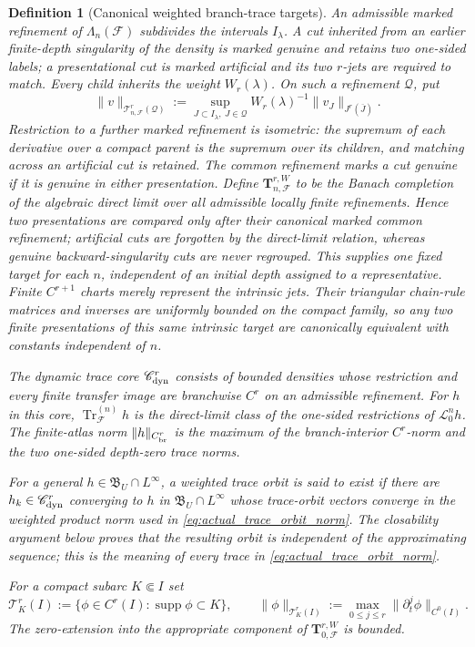 \documentclass[11pt]{amsart}
\theoremstyle{compactplain}
\theoremstyle{compactdefinition}
\newtheorem*{definition*}{Definition}
\theoremstyle{compactremark}
\newcommand{\Ltransfer}{\mathscr L}
\begin{document}
\begin{definition*}[Canonical weighted branch-trace targets]
An \emph{admissible marked refinement} of \(\Lambda_n(\mathscr F)\)
subdivides the intervals \(I_\lambda\).  A cut inherited from an earlier
finite-depth singularity of the density is marked genuine and retains two
one-sided labels; a presentational cut is marked artificial and its two
\(r\)-jets are required to match.  Every child inherits the weight
\(W_r(\lambda)\).  On such a refinement \(\mathcal Q\), put
\begin{equation}
\label{eq:dynamic_branch_trace_target}
 \|v\|_{\mathcal T_{n,\mathscr F}^r(\mathcal Q)}
 :=\sup_{J\subset I_\lambda,\ J\in\mathcal Q}
 W_r(\lambda)^{-1}\|v_J\|_{J^r(\overline J)}.
\end{equation}
Restriction to a further marked refinement is isometric: the supremum of each
derivative over a compact parent is the supremum over its children, and
matching across an artificial cut is retained.  The common refinement marks a
cut genuine if it is genuine in either presentation.  Define
\(\mathbf T_{n,\mathscr F}^{r,W}\) to be the Banach completion of the
algebraic direct limit over all admissible locally finite refinements.  Hence
two presentations are compared only after their canonical marked common
refinement; artificial cuts are forgotten by the direct-limit relation,
whereas genuine backward-singularity cuts are never regrouped.  This supplies one fixed target
for each \(n\), independent of an initial depth assigned to a representative.
Finite \(C^{r+1}\) charts merely represent the intrinsic jets.  Their
triangular chain-rule matrices and inverses are uniformly bounded on the
compact family, so any two finite presentations of this same intrinsic target
are canonically equivalent with constants independent of \(n\).

The dynamic trace core \(\mathscr C_{\rm dyn}^r\) consists of bounded
densities whose restriction and every finite transfer image are branchwise
\(C^r\) on an admissible refinement.  For \(h\) in this core,
\(\operatorname{Tr}^{(n)}_{\mathscr F}h\) is the direct-limit class of the
one-sided restrictions of \(\Ltransfer_0^nh\).  The finite-atlas norm
\(\|h\|_{C_{\rm br}^r}\) is the maximum of the branch-interior \(C^r\)-norm
and the two one-sided depth-zero trace norms.

For a general \(h\in\mathfrak B_U\cap L^\infty\), a weighted trace orbit is
said to exist if there are \(h_k\in\mathscr C_{\rm dyn}^r\) converging to
\(h\) in \(\mathfrak B_U\cap L^\infty\) whose trace-orbit vectors converge in
the weighted product norm used in \eqref{eq:actual_trace_orbit_norm}.  The
closability argument below proves that the resulting orbit is independent of
the approximating sequence; this is the meaning of every trace in
\eqref{eq:actual_trace_orbit_norm}.

For a compact subarc \(K\Subset I\) set
\[
 \mathcal T_K^r(I)
 :=\{\phi\in C^r(I):\operatorname{supp}\phi\subset K\},
 \qquad
 \|\phi\|_{\mathcal T_K^r(I)}
 :=\max_{0\le j\le r}\|\partial_t^j\phi\|_{C^0(I)}.
\]
The zero-extension into the appropriate component of
\(\mathbf T_{0,\mathscr F}^{r,W}\) is bounded.
\end{definition*}
\end{document}
